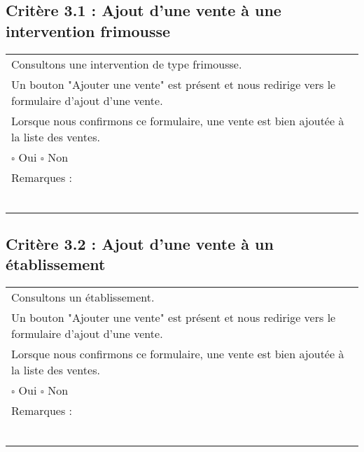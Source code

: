 \subsection*{Critère 3.1 : Ajout d'une vente à une intervention frimousse }
  		\begin{center}
    	 		\begin{tabular}[h]{|p{}|}
			\hline
				Consultons une intervention de type frimousse. \\
				Un bouton "Ajouter une vente" est présent et nous redirige vers le formulaire d'ajout d'une vente. \\
				Lorsque nous confirmons ce formulaire, une vente est bien ajoutée à la liste des ventes. \\
				
				$\square$ Oui  \hfill \hfill $\square$ Non \\\hline Remarques : \\ ~\\
			 \\\hline
     		\end{tabular}
  		\end{center}	
  		
  		
\subsection*{Critère 3.2 : Ajout d'une vente à un établissement }
  		\begin{center}
    	 		\begin{tabular}[h]{|p{}|}
			\hline
				Consultons un établissement. \\
				Un bouton "Ajouter une vente" est présent et nous redirige vers le formulaire d'ajout d'une vente. \\
				Lorsque nous confirmons ce formulaire, une vente est bien ajoutée à la liste des ventes. \\
				
				$\square$ Oui  \hfill \hfill $\square$ Non \\\hline Remarques : \\ ~\\
			 \\\hline
     		\end{tabular}
  		\end{center}	
  		
  		
